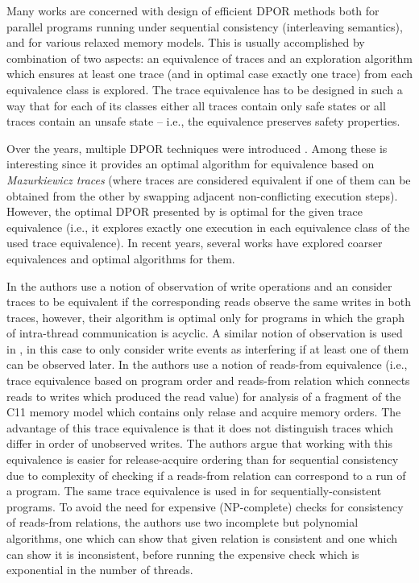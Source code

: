 Many works are concerned with design of efficient DPOR methods both for
parallel programs running under sequential consistency (interleaving
semantics), and for various relaxed memory models.
This is usually accomplished by combination of two aspects: an equivalence of
traces and an exploration algorithm which ensures at least one trace (and in
optimal case exactly one trace) from each equivalence class is explored.
The trace equivalence has to be designed in such a way that for each of its
classes either all traces contain only safe states or all traces contain an
unsafe state -- i.e., the equivalence preserves safety properties.

Over the years, multiple DPOR techniques were introduced
.
Among these  is interesting since it provides an optimal algorithm for equivalence based on \emph{Mazurkiewicz traces}  (where traces are considered equivalent if one of them can be obtained from the other by swapping adjacent non-conflicting execution steps).
However, the optimal DPOR presented by  is optimal for the
given trace equivalence (i.e., it explores exactly one execution in each equivalence class of the used trace equivalence).
In recent years, several works have explored coarser equivalences and optimal algorithms for them.

In  the authors use a notion of observation of write operations and an consider traces to be equivalent if the corresponding reads observe the same writes in both traces, however, their algorithm is optimal only for programs in which the graph of intra-thread communication is acyclic. 
A similar notion of observation is used in , in this case to only consider write events as interfering if at least one of them can be observed later.
In  the authors use a notion of reads-from equivalence (i.e., trace equivalence based on program order and reads-from relation which connects reads to writes which produced the read value) for analysis of a fragment of the C11 memory model which contains only relase and acquire memory orders.
The advantage of this trace equivalence is that it does not distinguish traces which differ in order of unobserved writes.
The authors argue that working with this equivalence is easier for release-acquire ordering than for sequential consistency due to complexity of checking if a reads-from relation can correspond to a run of a program.
The same trace equivalence is used in  for sequentially-consistent programs.
To avoid the need for expensive (NP-complete) checks for consistency of reads-from relations, the authors use two incomplete but polynomial algorithms, one which can show that given relation is consistent and one which can show it is inconsistent, before running the expensive check which is exponential in the number of threads.

